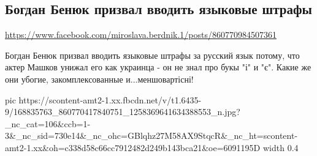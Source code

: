  
 
 
 
 

\subsection{Богдан Бенюк призвал вводить языковые штрафы}
\url{https://www.facebook.com/miroslava.berdnik.1/posts/860770984507361}

Богдан Бенюк призвал вводить языковые штрафы за русский язык потому, что актер
Машков унижал его как украинца - он не знал про букы "і" и  "є".  Какие же они
убогие, закомплексованные и...меншовартісні!

\ifcmt
  pic https://scontent-amt2-1.xx.fbcdn.net/v/t1.6435-9/168835763_860770417840751_1258369641634388553_n.jpg?_nc_cat=106&ccb=1-3&_nc_sid=730e14&_nc_ohc=GBlqhz27M58AX9StqcR&_nc_ht=scontent-amt2-1.xx&oh=c338d58c66cc7912482d249b143bca21&oe=6091195D
  width 0.4
\fi

